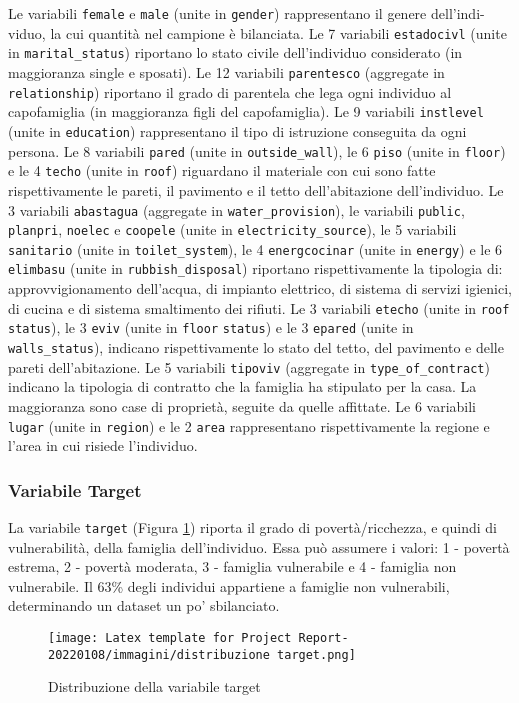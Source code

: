 Le variabili \texttt{female} e \texttt{male} (unite in \texttt{gender}) rappresentano il genere dell'indi-viduo, la cui quantità nel campione è bilanciata.
Le 7 variabili \texttt{estadocivl} (unite in \texttt{marital\_status}) riportano lo stato civile dell'individuo considerato (in maggioranza single e sposati).
Le 12 variabili \texttt{parentesco} (aggregate in \texttt{relationship}) riportano il grado di parentela che lega ogni individuo al capofamiglia (in maggioranza figli del capofamiglia). Le 9 variabili \texttt{instlevel} (unite in \texttt{education}) rappresentano il tipo di istruzione conseguita da ogni persona.
Le 8 variabili \texttt{pared} (unite in \texttt{outside\_wall}), le 6 \texttt{piso} (unite in \texttt{floor}) e le 4 \texttt{techo} (unite in \texttt{roof}) riguardano il materiale con cui sono fatte rispettivamente le pareti, il pavimento e il tetto dell'abitazione dell'individuo. 
Le 3 variabili \texttt{abastagua} (aggregate in \texttt{water\_provision}), le variabili \texttt{public}, \texttt{planpri}, \texttt{noelec} e \texttt{coopele} (unite in \texttt{electricity\_source}), le 5 variabili \texttt{sanitario} (unite in \texttt{toilet\_system}), le 4 \texttt{energcocinar} (unite in \texttt{energy}) e le 6 \texttt{elimbasu} (unite in \texttt{rubbish\_disposal}) riportano rispettivamente la tipologia di: approvvigionamento dell'acqua, di impianto elettrico, di sistema di servizi igienici, di cucina e di sistema smaltimento dei rifiuti. 
Le 3 variabili \texttt{etecho} (unite in \texttt{roof} \texttt{status}), le 3 \texttt{eviv} (unite in \texttt{floor} \texttt{status}) e le 3 \texttt{epared} (unite in \texttt{walls\_status}), indicano rispettivamente lo stato del tetto, del pavimento e delle pareti dell'abitazione.
Le 5 variabili \texttt{tipoviv} (aggregate in \texttt{type\_of\_contract}) indicano la tipologia di contratto che la famiglia ha stipulato per la casa. La maggioranza sono case di proprietà, seguite da quelle affittate. 
Le 6 variabili \texttt{lugar} (unite in \texttt{region}) e le 2 \texttt{area} rappresentano rispettivamente la regione e l'area in cui risiede l'individuo. 

\subsubsection{Variabile Target}
La variabile \texttt{target} (Figura \ref{fig:distrTarget}) riporta il grado di povertà/ricchezza, e quindi di vulnerabilità, della famiglia dell'individuo. 
Essa può assumere i valori: 1 - povertà estrema, 2 - povertà moderata, 3 - famiglia vulnerabile e 4 - famiglia non vulnerabile.
Il 63\% degli individui appartiene a famiglie non vulnerabili, determinando un dataset un po' sbilanciato.

\begin{figure}[H]
     \centering
     \texttt{[image: Latex template for Project Report-20220108/immagini/distribuzione target.png]}
     \caption{Distribuzione della variabile target}
     \label{fig:distrTarget}
\end{figure}

